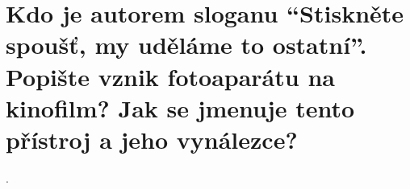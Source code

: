 \section{Kdo je autorem sloganu \enquote{Stiskněte spoušť, my uděláme to ostatní}. Popište vznik fotoaparátu na 
kinofilm? Jak se jmenuje tento přístroj a jeho vynálezce?}.
